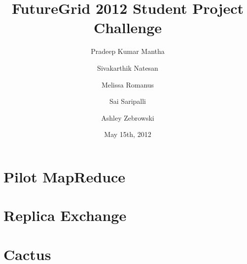 \documentclass[]{paper}
\begin{document}
\title{FutureGrid 2012 Student Project Challenge} 
\author{Pradeep Kumar Mantha 
  \and Sivakarthik Natesan 
  \and Melissa Romanus 
  \and Sai Saripalli 
  \and Ashley Zebrowski
}
\date{May 15th, 2012}
\maketitle

\begin{abstract}
\end{abstract}

\section{Pilot MapReduce}
\section{Replica Exchange}
\section{Cactus}

\begin{thebibliography}{9}
\end{thebibliography}
\end{document}
